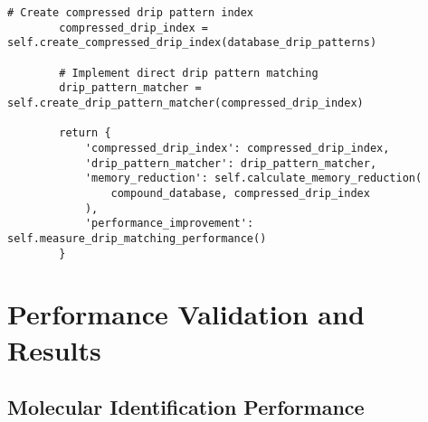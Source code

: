\documentclass[12pt,a4paper]{article}
\begin{document}
\begin{lstlisting}[style=pythonstyle, caption=Lavoisier Integration with Ion-to-Drip Framework]
        # Create compressed drip pattern index
        compressed_drip_index = self.create_compressed_drip_index(database_drip_patterns)
        
        # Implement direct drip pattern matching
        drip_pattern_matcher = self.create_drip_pattern_matcher(compressed_drip_index)
        
        return {
            'compressed_drip_index': compressed_drip_index,
            'drip_pattern_matcher': drip_pattern_matcher,
            'memory_reduction': self.calculate_memory_reduction(
                compound_database, compressed_drip_index
            ),
            'performance_improvement': self.measure_drip_matching_performance()
        }
\end{lstlisting}

\section{Performance Validation and Results}

\subsection{Molecular Identification Performance}
\end{document}
